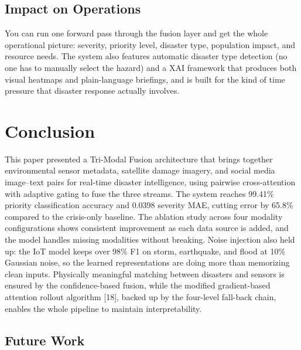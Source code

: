 \documentclass[journal]{IEEEtran}
\begin{document}
\subsection{Impact on Operations}
 
You can run one forward pass through the fusion layer and get the whole operational picture: severity, priority level, disaster type, population impact, and resource needs. The system also features automatic disaster type detection (no one has to manually select the hazard) and a XAI framework that produces both visual heatmaps and plain-language briefings, and is built for the kind of time pressure that disaster response actually involves.

\section{Conclusion}

This paper presented a Tri-Modal Fusion architecture that brings together environmental sensor metadata, satellite damage imagery, and social media image--text pairs for real-time disaster intelligence, using pairwise cross-attention with adaptive gating to fuse the three streams. The system reaches 99.41\% priority classification accuracy and 0.0398 severity MAE, cutting error by 65.8\% compared to the crisis-only baseline. The ablation study across four modality configurations shows consistent improvement as each data source is added, and the model handles missing modalities without breaking. Noise injection also held up: the IoT model keeps over 98\% F1 on storm, earthquake, and flood at 10\% Gaussian noise, so the learned representations are doing more than memorizing clean inputs. Physically meaningful matching between disasters and sensors is ensured by the confidence-based fusion, while the modified gradient-based attention rollout algorithm [18], backed up by the four-level fall-back chain, enables the whole pipeline to maintain interpretability.

\subsection{Future Work}
\label{sec:future}
\end{document}
